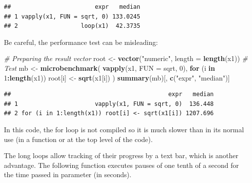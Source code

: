 \documentclass[
  12pt,
  american,
  a4paper,
  extrafontsizes,onecolumn,openright
  ]{memoir}
\newenvironment{Shaded}{\begin{snugshade}}{\end{snugshade}}
\newcommand{\AttributeTok}[1]{\textcolor[rgb]{0.13,0.29,0.53}{#1}}
\newcommand{\CommentTok}[1]{\textcolor[rgb]{0.56,0.35,0.01}{\textit{#1}}}
\newcommand{\ControlFlowTok}[1]{\textcolor[rgb]{0.13,0.29,0.53}{\textbf{#1}}}
\newcommand{\DecValTok}[1]{\textcolor[rgb]{0.00,0.00,0.81}{#1}}
\newcommand{\FunctionTok}[1]{\textcolor[rgb]{0.13,0.29,0.53}{\textbf{#1}}}
\newcommand{\NormalTok}[1]{#1}
\newcommand{\OtherTok}[1]{\textcolor[rgb]{0.56,0.35,0.01}{#1}}
\newcommand{\SpecialCharTok}[1]{\textcolor[rgb]{0.81,0.36,0.00}{\textbf{#1}}}
\newcommand{\StringTok}[1]{\textcolor[rgb]{0.31,0.60,0.02}{#1}}
\newlength{\rf}
\begin{document}
\begin{verbatim}
##                        expr   median
## 1 vapply(x1, FUN = sqrt, 0) 133.0245
## 2                  loop(x1)  42.3735
\end{verbatim}

\normalsize

Be careful, the performance test can be misleading:

\scriptsize

\begin{Shaded}
\begin{Highlighting}[]
\CommentTok{\# Preparing the result vector}
\NormalTok{root }\OtherTok{\textless{}{-}} \FunctionTok{vector}\NormalTok{(}\StringTok{"numeric"}\NormalTok{, }\AttributeTok{length =} \FunctionTok{length}\NormalTok{(x1))}
\CommentTok{\# Test}
\NormalTok{mb }\OtherTok{\textless{}{-}} \FunctionTok{microbenchmark}\NormalTok{(}
  \FunctionTok{vapply}\NormalTok{(x1, }\AttributeTok{FUN =}\NormalTok{ sqrt, }\DecValTok{0}\NormalTok{), }
  \ControlFlowTok{for}\NormalTok{ (i }\ControlFlowTok{in} \DecValTok{1}\SpecialCharTok{:}\FunctionTok{length}\NormalTok{(x1)) root[i] }\OtherTok{\textless{}{-}} \FunctionTok{sqrt}\NormalTok{(x1[i])}
\NormalTok{)}
\FunctionTok{summary}\NormalTok{(mb)[, }\FunctionTok{c}\NormalTok{(}\StringTok{"expr"}\NormalTok{, }\StringTok{"median"}\NormalTok{)]}
\end{Highlighting}
\end{Shaded}

\begin{verbatim}
##                                             expr   median
## 1                      vapply(x1, FUN = sqrt, 0)  136.448
## 2 for (i in 1:length(x1)) root[i] <- sqrt(x1[i]) 1207.696
\end{verbatim}

\normalsize

In this code, the for loop is not compiled so it is much slower than in its normal use (in a function or at the top level of the code).

The long loops allow tracking of their progress by a text bar, which is another advantage.
The following function executes pauses of one tenth of a second for the time passed in parameter (in seconds).

\scriptsize
\end{document}

